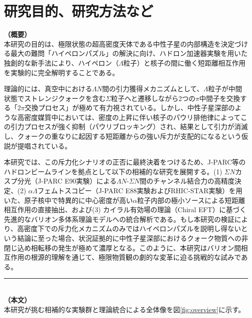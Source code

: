 \documentclass[11pt,a4j,dvipdfmx]{jarticle} 					%
\newcommand{\研究課題名}{加速器実験による短距離バリオン間相互作用の解明と中性子星ハイペロンパズルの解決}
\newcommand{\研究機関名}{東北大学}
\newcommand{\研究代表者氏名}{市川裕大}
\newcommand{\研究期間の最終元号年度}{13}  %
\begin{document}

\section{研究目的、研究方法など}

\noindent
\textbf{（概要）}\\
	本研究の目的は、極限状態の超高密度天体である中性子星の内部構造を決定づける最大の難問「ハイペロンパズル」の解決に向け、ハドロン加速器実験を用いた独創的な新手法により、ハイペロン（$\Lambda$粒子）と核子の間に働く短距離相互作用を実験的に完全解明することである。
	
	理論的には、真空中における$\Lambda N$間の引力獲得メカニズムとして、$\Lambda$粒子が中間状態でストレンジクォークを含む$\Sigma$粒子へと遷移しながら2つの$\pi$中間子を交換する「$2\pi$交換プロセス」が極めて有力視されている。しかし、中性子星深部のような高密度媒質中においては、密度の上昇に伴い核子のパウリ排他律によってこの引力プロセスが強く抑制（パウリブロッキング）され、結果として引力が消滅し、クォークの重なりに起因する短距離からの強い斥力が支配的になるという仮説が提唱されている。
	
	本研究では、この斥力化シナリオの正否に最終決着をつけるため、J-PARC等のハドロンビームラインを拠点として以下の相補的な研究を展開する。(1) $\Sigma N$カスプ分光（J-PARC E90実験）による$\Lambda N$-$\Sigma N$間のチャンネル結合力の高精度決定、(2) $\alpha\Lambda$フェムトスコピー（J-PARC E88実験およびRHIC-STAR実験）を用いた、原子核中で特異的に中心密度が高い$\alpha$粒子内部の極小ソースによる短距離相互作用の直接抽出、および(3) カイラル有効場の理論（Chiral EFT）に基づく先進的なバリオン多体系理論モデルへの統合解析である。もし本研究の検証により、高密度下での斥力化メカニズムのみではハイペロンパズルを説明し得ないという結論に至った場合、状況証拠的に中性子星深部におけるクォーク物質への非閉じ込め相転移の発生が極めて濃厚となる。このように、本研究はバリオン間相互作用の根源的理解を通じて、極限物質観の劇的な変革に迫る挑戦的な試みである。
	
	\vspace*{2zw}

\noindent
\rule{\linewidth}{1pt}\\
\noindent
\textbf{（本文）}\\
本研究が挑む相補的な実験群と理論統合による全体像を図\ref{fig:overview}に示す。
\end{document}
